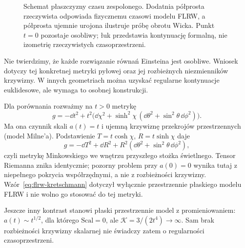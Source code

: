 \begin{przyklad}
\begin{figure}[htbp]
\centering
{}
\caption{Schemat płaszczyzny czasu zespolonego.
Dodatnia półprosta rzeczywista odpowiada fizycznemu
czasowi modelu FLRW, a półprosta ujemnie urojona
ilustruje próbę obrotu Wicka. Punkt $t=0$
pozostaje osobliwy; łuk przedstawia kontynuację
formalną, nie izometrię rzeczywistych czasoprzestrzeni.}
\label{fig:flrw-wick}
\end{figure}

Nie twierdzimy, że każde rozwiązanie równań
Einsteina jest osobliwe. Wniosek dotyczy tej
konkretnej metryki pyłowej oraz jej rozbieżnych
niezmienników krzywizny. W innych geometriach
można uzyskać regularne kontynuacje euklidesowe,
ale wymaga to osobnej konstrukcji.
\end{przyklad}

\begin{przyklad}
\label{prz:flrw-milne}
Dla porównania rozważmy na $t>0$ metrykę
\[
 g=-\dd t^2+t^2\bigl(\dd\chi^2+
 \sinh^2\chi\,(\dd\theta^2+\sin^2\theta\,\dd\phi^2)\bigr).
\]
Ma ona czynnik skali $a(t)=t$ i ujemną krzywiznę
przekrojów przestrzennych (model Milne'a).
Podstawienie $T=t\cosh\chi$, $R=t\sinh\chi$ daje
\[
 g=-\dd T^2+\dd R^2+
 R^2(\dd\theta^2+\sin^2\theta\,\dd\phi^2),
\]
czyli metrykę Minkowskiego we wnętrzu przyszłego stożka
świetlnego. Tensor Riemanna znika identycznie;
pozorny problem przy $a(0)=0$ wynika tutaj z niepełnego
pokrycia współrzędnymi, a nie z rozbieżności krzywizny.
Wzór~\eqref{eq:flrw-kretschmann} dotyczył wyłącznie
przestrzennie płaskiego modelu FLRW i nie wolno go
stosować do tej metryki.

Jeszcze inny kontrast stanowi płaski przestrzennie model
z promieniowaniem: $a(t)\sim t^{1/2}$, dla którego
$\mathrm{Scal}=0$, ale $\mathcal K=3/(2t^4)\to\infty$.
Sam brak rozbieżności krzywizny skalarnej nie świadczy
zatem o regularności czasoprzestrzeni.
\end{przyklad}

